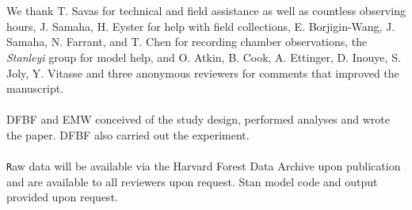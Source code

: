 \documentclass[11pt]{article}
\begin{document}


\vspace{2ex}\\
\vspace{1ex}\\
We thank T. Savas for technical and field assistance as well as countless observing hours, J. Samaha, H. Eyster for help with field collections, E. Borjigin-Wang, J. Samaha, N. Farrant, and T. Chen for recording chamber observations, the \emph{Stanleyi} group for model help, and O. Atkin, B. Cook, A. Ettinger, D. Inouye, S. Joly, Y. Vitasse and three anonymous reviewers for comments that improved the manuscript. 
\vspace{2ex}\\
\vspace{1ex}\\
DFBF and EMW conceived of the study design, performed analyses and wrote the paper. DFBF also carried out the experiment.
\vspace{2ex}\\
\vspace{1ex}\\
\texttt Raw data will be available via the Harvard Forest Data Archive upon publication and are available to all reviewers upon request. {Stan} model code and output provided upon request.
\newpage



\end{document}
